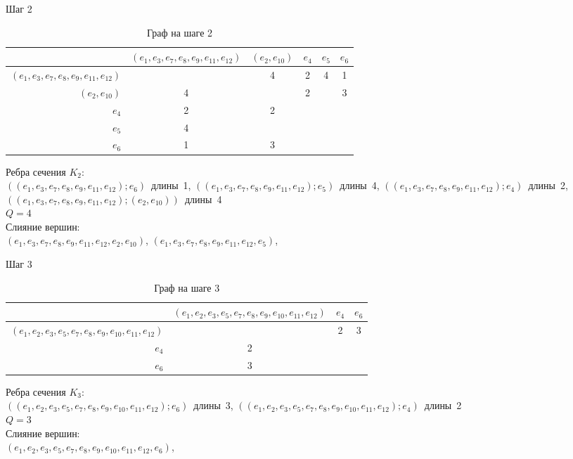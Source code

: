 \begin{minipage}{\textwidth}
Шаг 2\\
\begin{table}[H]
\centering
\caption{Граф на шаге 2}
\begin{tabular}{r*{5}{|c}}
&$(e_{1},e_{3},e_{7},e_{8},e_{9},e_{11},e_{12})$&$(e_{2},e_{10})$&$e_{4}$&$e_{5}$&$e_{6}$\\
\hline $(e_{1},e_{3},e_{7},e_{8},e_{9},e_{11},e_{12})$&&4&2&4&1\\
\hline $(e_{2},e_{10})$&4&&2&&3\\
\hline $e_{4}$&2&2&&&\\
\hline $e_{5}$&4&&&&\\
\hline $e_{6}$&1&3&&&\\
\end{tabular}
\end{table}
Ребра сечения $K_{2}$:\\
\mbox{$((e_{1},e_{3},e_{7},e_{8},e_{9},e_{11},e_{12});e_{6})$ длины 1},
\mbox{$((e_{1},e_{3},e_{7},e_{8},e_{9},e_{11},e_{12});e_{5})$ длины 4},
\mbox{$((e_{1},e_{3},e_{7},e_{8},e_{9},e_{11},e_{12});e_{4})$ длины 2},
\mbox{$((e_{1},e_{3},e_{7},e_{8},e_{9},e_{11},e_{12});(e_{2},e_{10}))$ длины 4}\\
$Q=4$\\
Слияние вершин:\\
\mbox{$(e_{1},e_{3},e_{7},e_{8},e_{9},e_{11},e_{12},e_{2},e_{10})$},
\mbox{$(e_{1},e_{3},e_{7},e_{8},e_{9},e_{11},e_{12},e_{5})$},
\end{minipage}
\bigskip
\noindent
\begin{minipage}{\textwidth}
Шаг 3\\
\begin{table}[H]
\centering
\caption{Граф на шаге 3}
\begin{tabular}{r*{3}{|c}}
&$(e_{1},e_{2},e_{3},e_{5},e_{7},e_{8},e_{9},e_{10},e_{11},e_{12})$&$e_{4}$&$e_{6}$\\
\hline $(e_{1},e_{2},e_{3},e_{5},e_{7},e_{8},e_{9},e_{10},e_{11},e_{12})$&&2&3\\
\hline $e_{4}$&2&&\\
\hline $e_{6}$&3&&\\
\end{tabular}
\end{table}
Ребра сечения $K_{3}$:\\
\mbox{$((e_{1},e_{2},e_{3},e_{5},e_{7},e_{8},e_{9},e_{10},e_{11},e_{12});e_{6})$ длины 3},
\mbox{$((e_{1},e_{2},e_{3},e_{5},e_{7},e_{8},e_{9},e_{10},e_{11},e_{12});e_{4})$ длины 2}\\
$Q=3$\\
Слияние вершин:\\
\mbox{$(e_{1},e_{2},e_{3},e_{5},e_{7},e_{8},e_{9},e_{10},e_{11},e_{12},e_{6})$},
\end{minipage}

